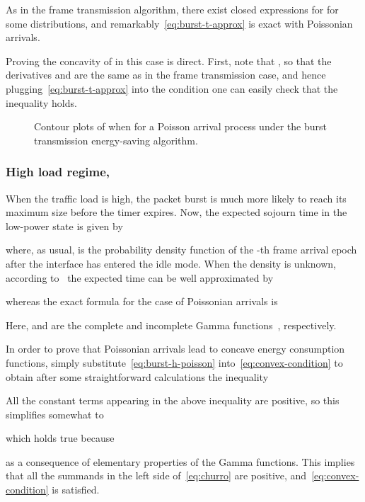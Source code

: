 \documentclass[journal,english,twocolumn,10pt,letterpaper]{IEEEtran}
\newcommand{\added}[1]{{#1}}
\begin{document}
As in the frame transmission algorithm, there exist closed expressions for  for some distributions, and
remarkably~\eqref{eq:burst-t-approx} is exact with Poissonian arrivals.

Proving the concavity of  in this case is direct. First, note that
, so that the derivatives  and  are the same
as in the frame transmission case, and hence
plugging~\eqref{eq:burst-t-approx} into the condition  one can easily check that the inequality
holds.

\begin{figure*}
  \centering
  \caption{\label{fig:contour} Contour plots of  when
     for a Poisson arrival process under the burst transmission
    energy-saving algorithm.}
\end{figure*}

\subsubsection{High load regime, }
\label{sec:high-load-regime}

When the traffic load is high, the packet burst is much more likely to reach
its maximum size  before the timer expires. Now, the expected sojourn
time in the low-power state is given by

where, as usual,  is the probability density function of the
-th frame arrival epoch after the interface has entered the idle mode.
When the density is unknown, \added{according
  to~\cite{herreria12:_gi_g_model_gb_energ_effic_ether}} the expected time can
be well approximated by

whereas the exact formula for the case of Poissonian arrivals is

Here,  and  are the complete and
incomplete Gamma functions~\cite{Abramowitz72}, respectively.

In order to prove that Poissonian arrivals lead to concave energy consumption
functions, simply substitute~\eqref{eq:burst-h-poisson}
into~\eqref{eq:convex-condition} to obtain after some straightforward
calculations the inequality

All the constant terms appearing in the above inequality are positive, so
this simplifies somewhat to

which holds true because

as a consequence of elementary properties of the Gamma functions. This implies
that all the summands in the left side of~\eqref{eq:churro} are positive,
and~\eqref{eq:convex-condition} is satisfied.
\end{document}
